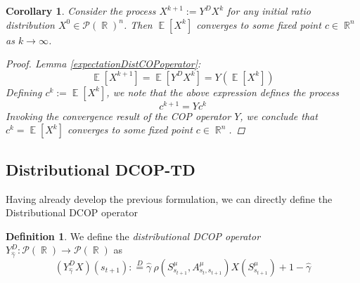 \documentclass[12pt,a4paper,openright,twoside]{article}
\DeclareMathOperator*{\E}{\mathbb{E}}
\DeclareMathOperator*{\R}{\mathbb{R}}
\numberwithin{equation}{section}
\newtheorem{corol}[theorem]{Corollary}
\theoremstyle{definition}
\newtheorem{definition}{Definition}
\theoremstyle{remark}
\theoremstyle{plain}
\begin{document}
\begin{corol} \label{convergenceExpectationDistCop}
	Consider the process $X^{k+1} := Y^D X^k$ for any initial ratio distribution $X^0 \in \mathcal{P}(\R)^n$. Then $\E[X^{k}]$ converges to some fixed point $c \in \R^n$ as $k \rightarrow \infty$.
	
	\begin{proof}
		Lemma \ref{expectationDistCOPoperator}:
		\begin{equation*}
			\E [X^{k+1}] = \E [Y^D X^{k}] = Y (\E [X^k])
		\end{equation*}
		Defining $c^k := \E [X^k]$, we note that the above expression defines the process 
		\begin{equation*}
			c^{k+1} = Y c^k 
		\end{equation*}
		Invoking the convergence result of the COP operator $Y$, we conclude that $c^k = \E[X^{k}]$ converges to some fixed point $c \in \R^n$. 
	\end{proof}
\end{corol}




\subsection{Distributional DCOP-TD}

Having already develop the previous formulation, we can directly define the Distributional DCOP operator%

\begin{definition} \label{defDistCOPoperator}
	We define the \textit{distributional DCOP operator} $Y^D_{\hat{\gamma}}: \mathscr{P}(\R) \rightarrow \mathscr{P}(\R)$ as 
	\begin{equation*}
		(Y^D_{\hat{\gamma}} X)(s_{t+1}) :\stackrel{D}{=} \hat{\gamma} \ \rho(S^{\mu}_{s_{t+1}},A^{\mu}_{s_{t},s_{t+1}}) X(S^{\mu}_{s_{t+1}}) + 1 -\hat{\gamma}
	\end{equation*}
\end{definition}
\end{document}
